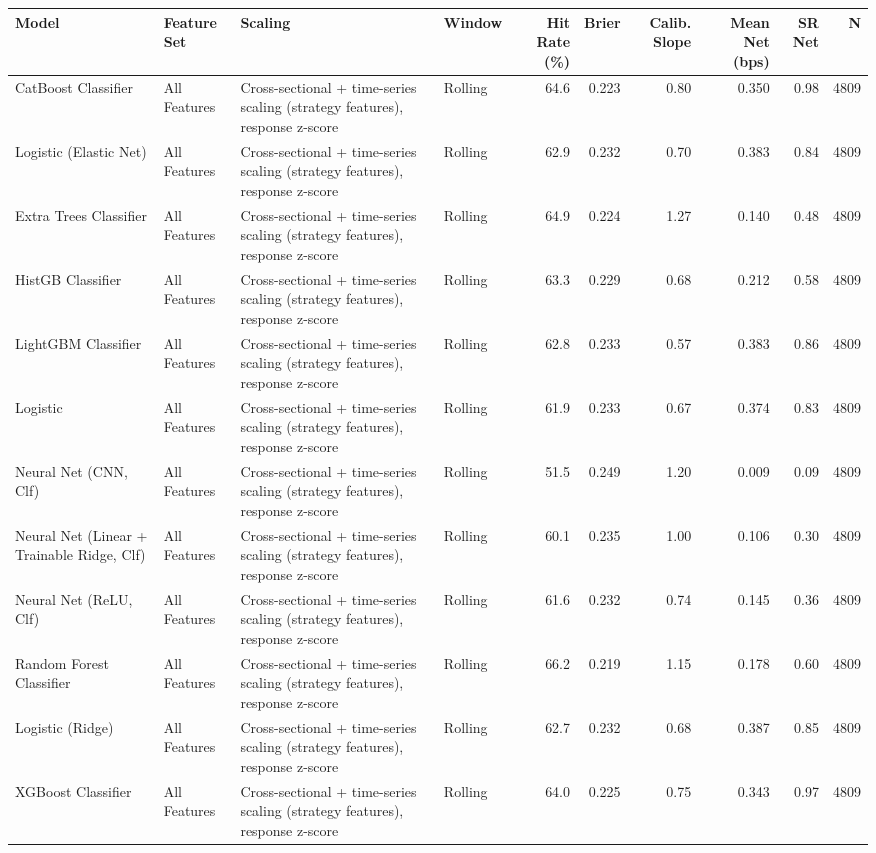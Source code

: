 \begin{tabular}{llllrrrrrr}
\toprule
Model & Feature Set & Scaling & Window & Hit Rate (\%) & Brier & Calib. Slope & Mean Net (bps) & SR Net & N \\
\midrule
CatBoost Classifier & All Features & Cross-sectional + time-series scaling (strategy features), response z-score & Rolling & 64.6 & 0.223 & 0.80 & 0.350 & 0.98 & 4809 \\
Logistic (Elastic Net) & All Features & Cross-sectional + time-series scaling (strategy features), response z-score & Rolling & 62.9 & 0.232 & 0.70 & 0.383 & 0.84 & 4809 \\
Extra Trees Classifier & All Features & Cross-sectional + time-series scaling (strategy features), response z-score & Rolling & 64.9 & 0.224 & 1.27 & 0.140 & 0.48 & 4809 \\
HistGB Classifier & All Features & Cross-sectional + time-series scaling (strategy features), response z-score & Rolling & 63.3 & 0.229 & 0.68 & 0.212 & 0.58 & 4809 \\
LightGBM Classifier & All Features & Cross-sectional + time-series scaling (strategy features), response z-score & Rolling & 62.8 & 0.233 & 0.57 & 0.383 & 0.86 & 4809 \\
Logistic & All Features & Cross-sectional + time-series scaling (strategy features), response z-score & Rolling & 61.9 & 0.233 & 0.67 & 0.374 & 0.83 & 4809 \\
Neural Net (CNN, Clf) & All Features & Cross-sectional + time-series scaling (strategy features), response z-score & Rolling & 51.5 & 0.249 & 1.20 & 0.009 & 0.09 & 4809 \\
Neural Net (Linear + Trainable Ridge, Clf) & All Features & Cross-sectional + time-series scaling (strategy features), response z-score & Rolling & 60.1 & 0.235 & 1.00 & 0.106 & 0.30 & 4809 \\
Neural Net (ReLU, Clf) & All Features & Cross-sectional + time-series scaling (strategy features), response z-score & Rolling & 61.6 & 0.232 & 0.74 & 0.145 & 0.36 & 4809 \\
Random Forest Classifier & All Features & Cross-sectional + time-series scaling (strategy features), response z-score & Rolling & 66.2 & 0.219 & 1.15 & 0.178 & 0.60 & 4809 \\
Logistic (Ridge) & All Features & Cross-sectional + time-series scaling (strategy features), response z-score & Rolling & 62.7 & 0.232 & 0.68 & 0.387 & 0.85 & 4809 \\
XGBoost Classifier & All Features & Cross-sectional + time-series scaling (strategy features), response z-score & Rolling & 64.0 & 0.225 & 0.75 & 0.343 & 0.97 & 4809 \\
\bottomrule
\end{tabular}
